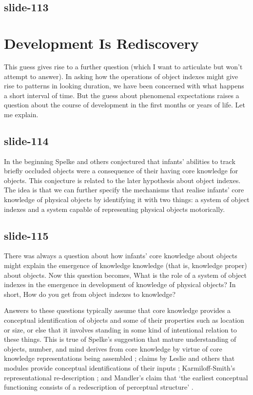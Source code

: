 \documentclass[12pt,\papersize]{extarticle}
\begin{document}
\subsection{slide-113}
\section{Development Is Rediscovery}

This guess gives rise to a further question (which I want to articulate
but won’t attempt to answer).
In asking how the operations of object indexes might give rise to
patterns in looking duration, we have been concerned with what happens a
short interval of time.
But the guess about phenomenal expectations raises a question
about the course of development in the first months or years of life.
Let me explain.

\subsection{slide-114}
In the beginning Spelke and others conjectured that infants’
abilities to track briefly occluded objects were a consequence of their
having core knowledge for objects.
This conjecture is related to the later hypothesis about object indexes.
The idea is that we can further specify the mechanisms that realise
infants’ core knowledge of physical objects by identifying it with
two things: a system of object indexes and a system capable of representing
physical objects motorically.

\subsection{slide-115}
There was always a question about how infants’ core knowledge about
objects might explain the emergence of knowledge knowledge
(that is, knowledge proper) about objects.
Now this question becomes, What is the role of a system of object
indexes in the emergence in development of knowledge of physical
objects?
In short, How do you get from object indexes to knowledge?

Answers to these questions typically assume that core knowledge
provides a conceptual identification of objects and some of their
properties such as location or size,
or else that it involves standing in some kind of intentional
relation to these things.
This is true of
Spelke’s suggestion that mature understanding of objects, number,
and mind derives from core knowledge by virtue of core knowledge
representations being assembled \citep{Spelke:2000nf};
claims by Leslie and others
that modules provide conceptual identifications of their inputs
\citep{Leslie:1988ct};
Karmiloff-Smith’s representational re-description
\citep{Karmiloff-Smith:1992lv};
and Mandler’s claim
that ‘the earliest conceptual functioning consists of a redescription
of perceptual structure’ \citep{Mandler:1992vn}.
\end{document}
